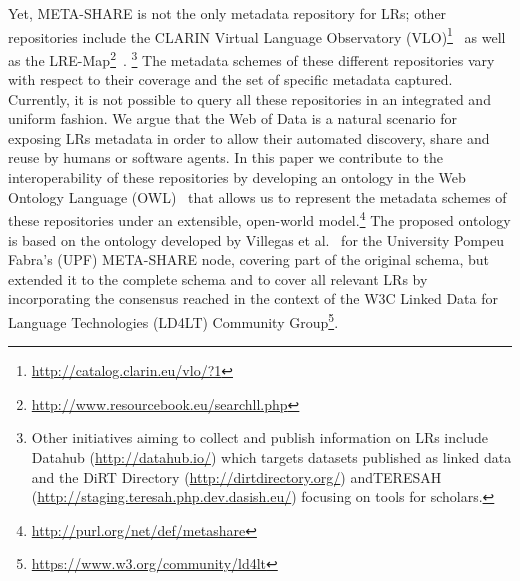 \documentclass{llncs}
\begin{document}
Yet, META-SHARE is not the only metadata repository for LRs;
other repositories include the CLARIN Virtual Language Observatory
(VLO)\footnote{\url{http://catalog.clarin.eu/vlo/?1}}~\cite{broeder2010data} as
well as the LRE-Map\footnote{\url{http://www.resourcebook.eu/searchll.php}}~\cite{calzolari2012lre}.
\footnote{Other initiatives aiming to collect and publish information on LRs include Datahub (\url{http://datahub.io/}) which targets datasets published as linked data and the DiRT Directory (\url{http://dirtdirectory.org/}) andTERESAH %
(\url{http://staging.teresah.php.dev.dasish.eu/}) focusing on tools for scholars.} 
The metadata schemes of these different repositories vary with respect to their coverage and the set of specific metadata captured.
Currently, it is not possible to query all these repositories in an integrated and uniform fashion.
We argue that the Web of Data is a natural scenario for exposing LRs metadata in order to allow their automated discovery, share and reuse by humans or software agents. %
In this paper we contribute to the interoperability of these repositories by
developing an ontology in the Web Ontology Language (OWL)~\cite{motik2012owl}
that allows us to represent the metadata schemes of these repositories under an
extensible, open-world model.\footnote{\url{http://purl.org/net/def/metashare}}
The proposed ontology is based on the ontology developed by Villegas et
al.~\cite{Villegas2014} for the University Pompeu Fabra's (UPF) META-SHARE node, covering part of the original schema, but extended it to the complete schema and to cover all relevant LRs by incorporating the consensus
reached in the context of the W3C Linked Data for Language Technologies (LD4LT) Community Group\footnote{\url{https://www.w3.org/community/ld4lt}}.
\end{document}
